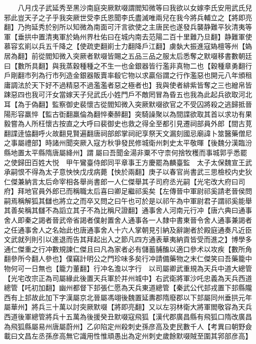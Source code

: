 　　八月戊子武延秀至黑沙南庭突厥默啜謂閻知微等曰我欲以女嫁李氏安用武氏兒邪此豈天子之子乎我突厥世受李氏恩聞李氏盡滅唯兩兒在我今將兵輔立之【將即亮翻】乃拘延秀於别所以知微為南面可汗言欲使之主唐民也遂發兵襲静難平狄清夷等軍【垂拱中置清夷軍於媯州界杜佑曰在城内南去范陽二百十里難乃旦翻】静難軍使慕容玄崱以兵五千降之【使疏吏翻崱士力翻降戶江翻】虜埶大振進寇媯檀等州【媯居為翻】前從閻知微入突厥者默啜皆賜之五品三品之服太后悉奪之默啜移書數朝廷曰【數所具翻】與我蒸穀種種之不生一也金銀器皆行濫非真物二也【穀種章勇翻行戶剛翻市列為行市列造金銀器販賣率殽它物以求贏俗謂之行作濫惡也開元八年頒租庸調法於天下好不過精惡不過濫濫者惡之極者也】我與使者緋紫皆奪之三也繒帛皆踈惡四也我可汗女當嫁天子兒武氏小姓門戶不敵罔冒為昏五也我為此起兵欲取河北耳【為于偽翻】監察御史裴懷古從閻知微入突厥默啜欲官之不受囚將殺之逃歸抵晉陽形容羸悴【監古衘翻羸倫為翻悴秦醉翻】突騎譟聚以為間諜欲取其首以求功有果毅嘗為人所枉懷古按直之大呼曰裴御史也救之得全至都引見遷祠部員外郎【間古莧翻諜逹恊翻呼火故翻見賢遍翻唐祠部郎掌祠祀享祭天文漏刻國忌廟諱卜筮醫藥僧尼之事屬禮部】時諸州聞突厥入寇方秋爭發民修城衛州刺史太平敬暉【後魏分漢臨汾縣地置太平縣隋唐屬絳州】謂屬曰吾聞金湯非粟不守柰何捨牧穫而事城郭乎悉罷之使歸田百姓大悦　甲午鸞臺侍郎同平章事王方慶罷為麟臺監　太子太保魏宣王武承嗣恨不得為太子意怏怏戊戌病薨【怏於兩翻】庚子以春官尚書武三思檢校内史狄仁傑兼納言太后命宰相各舉尚書郎一人仁傑舉其子司府丞光嗣【光宅改大府曰司府】拜地官員外郎已而稱職太后喜曰卿足繼祁奚矣【左傳晉中軍尉祁奚請老晉侯問嗣焉稱解狐其讎也將立之而卒又問之曰午也可於是以祁午為中軍尉君子謂祁奚能舉其善矣稱其讎不為謟立其子不為比稱尺證翻】通事舍人河南元行冲【唐六典曰通事舍人即秦之謁者晉武帝省謁者僕射置舍人通事各一人隸中書東晉令舍人通事兼謁者之任通事舍人之名始此也唐通事舍人十六人掌朝見引納及辭謝者於殿庭通奏凡近臣文武就列則引以進退而告其拜起出入之節凡四方通表華夷納貢皆受而進之】博學多通仁傑重之行冲數規諫仁傑且曰凡為家者必有儲蓄脯醢以適口參术以攻疾【數所角翻參所今翻人參也】僕竊計明公之門珍味多矣行冲請備藥物之末仁傑笑曰吾藥籠中物何可一日無也【籠力董翻】行冲名澹以字行　以司屬卿武重規為天兵中道大總管【光宅改宗正為司屬緣此後置天兵軍於并州城中】右武衛將軍沙吒忠義為天兵西道總管【吒初加翻】幽州都督下邽張仁愿為天兵東道總管【秦武公代邽戎置下邽縣隴西有上邽故此加下字漢屬京北晉屬馮翊後魏置延夀郡隋廢郡以下邽屬同州垂拱元年屬華州】將兵三十萬以討突厥默啜【將即亮翻】又以左羽林衛大將軍閻敬容為天兵西道後軍總管將兵十五萬為後援癸丑默啜寇飛狐【漢代郡廣昌縣有飛狐口隋改廣昌為飛狐縣屬易州唐屬蔚州】乙卯陷定州殺刺史孫彦高及吏民數千人【考異曰朝野僉載曰文昌左丞孫彦高無它識用性惟頑愚出為定州刺史歲餘默啜賊至圍其郛部彦高】

